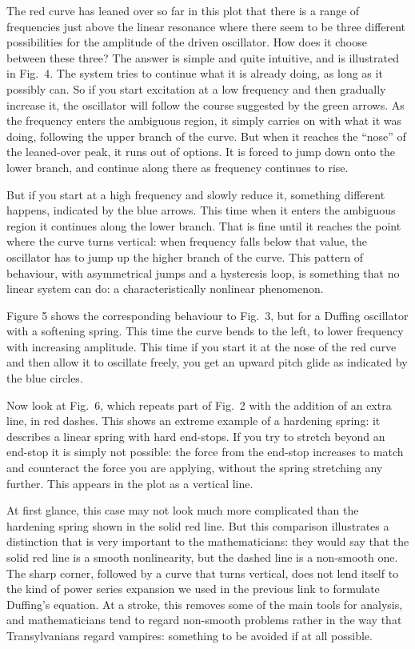   The red curve has leaned over so far in this plot that there is a range of 
  frequencies just above the linear resonance where there seem to be three 
  different possibilities for the amplitude of the driven oscillator. How does 
  it choose between these three? The answer is simple and quite intuitive, and 
  is illustrated in Fig.\ 4. The system tries to continue what it is already 
  doing, as long as it possibly can. So if you start excitation at a low 
  frequency and then gradually increase it, the oscillator will follow the 
  course suggested by the green arrows. As the frequency enters the ambiguous 
  region, it simply carries on with what it was doing, following the upper 
  branch of the curve. But when it reaches the ``nose'' of the leaned-over 
  peak, it runs out of options. It is forced to jump down onto the lower 
  branch, and continue along there as frequency continues to rise. 

  But if you start at a high frequency and slowly reduce it, something 
  different happens, indicated by the blue arrows. This time when it enters the 
  ambiguous region it continues along the lower branch. That is fine until it 
  reaches the point where the curve turns vertical: when frequency falls below 
  that value, the oscillator has to jump up the higher branch of the curve. 
  This pattern of behaviour, with asymmetrical jumps and a hysteresis loop, is 
  something that no linear system can do: a characteristically nonlinear 
  phenomenon. 

  Figure 5 shows the corresponding behaviour to Fig.\ 3, but for a Duffing 
  oscillator with a softening spring. This time the curve bends to the left, to 
  lower frequency with increasing amplitude. This time if you start it at the 
  nose of the red curve and then allow it to oscillate freely, you get an 
  upward pitch glide as indicated by the blue circles. 

  Now look at Fig.\ 6, which repeats part of Fig.\ 2 with the addition of an 
  extra line, in red dashes. This shows an extreme example of a hardening 
  spring: it describes a linear spring with hard end-stops. If you try to 
  stretch beyond an end-stop it is simply not possible: the force from the 
  end-stop increases to match and counteract the force you are applying, 
  without the spring stretching any further. This appears in the plot as a 
  vertical line. 

  At first glance, this case may not look much more complicated than the 
  hardening spring shown in the solid red line. But this comparison illustrates 
  a distinction that is very important to the mathematicians: they would say 
  that the solid red line is a smooth nonlinearity, but the dashed line is a 
  non-smooth one. The sharp corner, followed by a curve that turns vertical, 
  does not lend itself to the kind of power series expansion we used in the 
  previous link to formulate Duffing’s equation. At a stroke, this removes some 
  of the main tools for analysis, and mathematicians tend to regard non-smooth 
  problems rather in the way that Transylvanians regard vampires: something to 
  be avoided if at all possible. 

